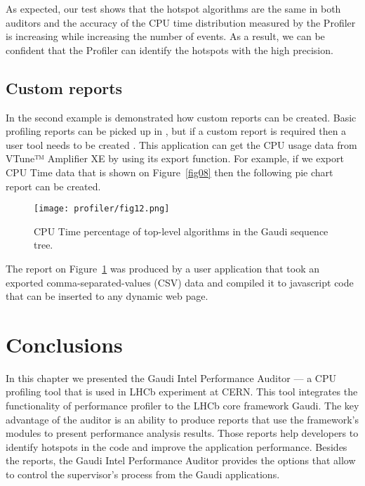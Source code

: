 As expected, our test shows that the hotspot algorithms are the same in both
auditors and the accuracy of the CPU time distribution measured by the Profiler
is increasing while increasing the number of events. As a result, we can be
confident that the Profiler can identify the hotspots with the high precision.

\subsection{Custom reports}

In the second example is demonstrated how custom reports can be created. Basic
profiling reports can be picked up in
\amp, but if a custom report is required then a user tool needs to be created .
This application can get the CPU usage data from VTune™ Amplifier XE by using
its export function. For example, if we export CPU Time data that is shown on
Figure~\ref{fig08} then the following pie chart report can be created.

\begin{figure}[H]
\begin{minipage}{\textwidth}
\begin{center}
\texttt{[image: profiler/fig12.png]}
\caption{\label{fig12}CPU Time percentage of top-level algorithms in the Gaudi sequence tree.}
\end{center}
\end{minipage}
\end{figure}

The report on Figure~\ref{fig12} was produced by a user application that took
an exported  comma-separated-values (CSV) data and compiled it to javascript
code that can be inserted to any dynamic web page.

\section{Conclusions}
In this chapter we presented the Gaudi Intel Performance Auditor --- a CPU
profiling tool that is used in LHCb experiment at CERN. This tool integrates
the functionality of \iamp performance profiler to the LHCb core framework
Gaudi. The key advantage of the auditor is an ability to produce reports that
use the framework's modules to present performance analysis results. Those
reports help  developers to identify hotspots in the code and improve the
application performance. Besides the reports, the Gaudi Intel Performance
Auditor provides the options that allow to control the \iamp supervisor’s
process from the Gaudi applications.

